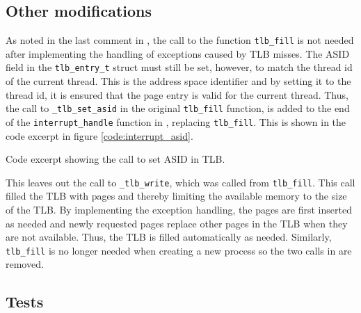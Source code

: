 \subsection{Other modifications}
As noted in the last comment in , the call to the
function \verb|tlb_fill| is not needed after implementing the handling of
exceptions caused by TLB misses. The ASID field in the \verb|tlb_entry_t| struct
must still be set, however, to match the thread id of the current thread. This
is the address space identifier and by setting it to the thread id, it is
ensured that the page entry is valid for the current thread. Thus, the call to
\verb|_tlb_set_asid| in the original \verb|tlb_fill| function, is added to the
end of the \verb|interrupt_handle| function in ,
replacing \verb|tlb_fill|. This is shown in the code excerpt in figure
\ref{code:interrupt_asid}.

{Code excerpt showing the call to set ASID in TLB.}

This leaves out the call to \verb|_tlb_write|, which was called from
\verb|tlb_fill|. This call filled the TLB with pages and thereby limiting the
available memory to the size of the TLB. By implementing the exception handling,
the pages are first inserted as needed and newly requested pages replace other
pages in the TLB when they are not available. Thus, the TLB is filled
automatically as needed. Similarly, \verb|tlb_fill| is no longer needed when
creating a new process so the two calls in  are removed.


\subsection{Tests}

